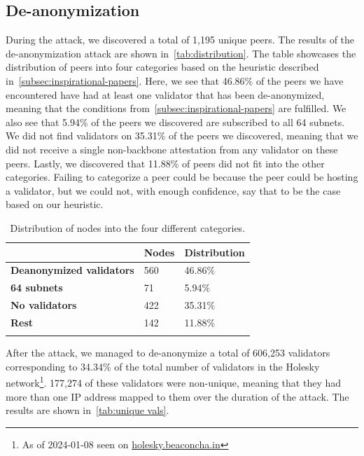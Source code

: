 \subsection{De-anonymization}\label{subsec:de-anonymization}
During the attack, we discovered a total of 1,195 unique peers.
The results of the de-anonymization attack are shown in~\autoref{tab:distribution}.
The table showcases the distribution of peers into four categories based on the heuristic described in~\autoref{subsec:inspirational-papers}.
Here, we see that 46.86\% of the peers we have encountered have had at least one validator that has been de-anonymized, meaning that the conditions from~\autoref{subsec:inspirational-papers} are fulfilled.
We also see that 5.94\% of the peers we discovered are subscribed to all 64 subnets.
We did not find validators on 35.31\% of the peers we discovered, meaning that we did not receive a single non-backbone attestation from any validator on these peers.
Lastly, we discovered that 11.88\% of peers did not fit into the other categories.
Failing to categorize a peer could be because the peer could be hosting a validator, but we could not, with enough confidence, say that to be the case based on our heuristic.


\begin{table}[]
    \centering
    \caption{Distribution of nodes into the four different categories.}
    \begin{tabular}{lll}
        \hline
        & \textbf{Nodes} & \textbf{Distribution} \\ \hline
        \textbf{Deanonymized validators} & 560            & 46.86\%                 \\
        \textbf{64 subnets}              & 71             & 5.94\%                  \\
        \textbf{No validators}           & 422              & 35.31\%               \\
        \textbf{Rest}                    & 142            & 11.88\%                 \\ \hline
        \\
    \end{tabular}
    \label{tab:distribution}
\end{table}


After the attack, we managed to de-anonymize a total of 606,253 validators corresponding to 34.34\% of the total number of validators in the Holesky network\footnote{As of 2024-01-08 seen on \href{https://holesky.beaconcha.in/}{holesky.beaconcha.in}}.
177,274 of these validators were non-unique, meaning that they had more than one IP address mapped to them over the duration of the attack.
The results are shown in~\autoref{tab:unique vals}.

